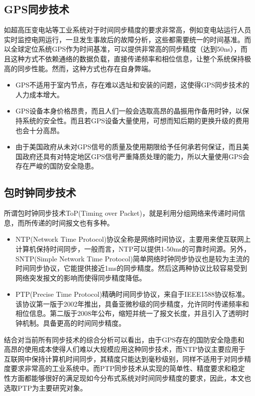 \subsection{GPS同步技术}
如超高压变电站等工业系统对于时间同步精度的要求非常高，例如变电站运行人员实时监控电网运行，一旦发生事故后的故障分析，这些都需要统一的时间基准。而以全球定位系统GPS作为时间基准，可以提供非常高的同步精度（达到50ns），而且这种方式不依赖通络的数据负载，直接传递频率和相位信息，让整个系统保持极高的同步性能。然而，这种方式也存在自身弊端。
\begin{itemize}[noitemsep,topsep=0pt,parsep=0pt,partopsep=0pt]
	\item GPS不适用于室内节点，存在难以选址和安装的问题，这使得GPS同步技术的人力成本增大。
	\item GPS设备本身价格昂贵，而且人们一般会选取高昂的晶振用作备用时钟，以保持系统的安全性。而且若GPS设备大量使用，可想而知后期的更换升级的费用也会十分高昂。
	\item 由于美国政府从未对GPS信号的质量及使用期限给予任何承若何保证，而且美国政府还具有对特定地区GPS信号严重降质处理的能力，所以大量使用GPS会存在严峻的国防安全隐患。
\end{itemize}

\subsection{包时钟同步技术}
所谓包时钟同步技术ToP(Timing over Packet)，就是利用分组网络来传递时间信息，而所传递的时间报文也有多种。
\begin{itemize}[noitemsep,topsep=0pt,parsep=0pt,partopsep=0pt]
	\item  NTP(Network Time Protocol)协议全称是网络时间协议，主要用来使互联网上计算机保持时间同步，一般而言，NTP可以提供1-50ms的可靠时间源。另外，SNTP(Simple Network Time Protocol)简单网络时钟同步协议也是较为主流的时间同步协议，它能提供接近1ms的同步精度。然后这两种协议比较容易受到网络突发报文的影响而使得同步精度降低。
	\item PTP(Precise Time Protocol)精确时间同步协议，来自于IEEE1588协议标准。该协议第一版于2002年推出，具备亚微秒级的同步精度，允许同时传递频率和相位信息。第二版于2008年公布，缩短并统一了报文长度，并且引入了透明时钟机制。具备更高的时间同步精度。
\end{itemize}

结合对当前所有同步技术的综合分析可以看出，由于GPS存在的国防安全隐患和高昂的使用成本使得人们难以大规模应用这种同步技术，而NTP协议主要应用于互联网中保持计算机时间同步，其精度只能达到毫秒级别，同样不适用于对同步精度要求非常高的工业系统中。而PTP同步技术从实现的简单性、精度要求和稳定性方面都能够很好的满足现如今分布式系统对时间同步精度的要求，因此，本文也选取PTP为主要研究对象。

